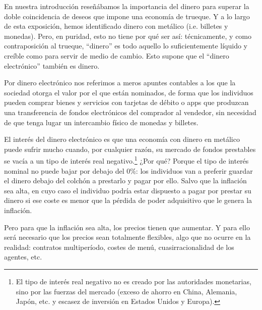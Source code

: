 \documentclass[10pt,a4paper]{article}
\begin{document}
En nuestra introducción reseñábamos la importancia del dinero para superar la doble coincidencia de deseos que impone una economía de trueque. Y a lo largo de esta exposición, hemos identificado dinero con metálico (i.e. billetes y monedas). Pero, en puridad, esto no tiene por qué ser así: técnicamente, y como contraposición al trueque, “dinero” es todo aquello lo suficientemente líquido y creíble como para servir de medio de cambio. Esto supone que el “dinero electrónico” también es dinero. 

Por dinero electrónico nos referimos a meros apuntes contables a los que la sociedad otorga el valor por el que están nominados, de forma que los individuos pueden comprar bienes y servicios con tarjetas de débito o apps que produzcan una transferencia de fondos electrónicos del comprador al vendedor, sin necesidad de que tenga lugar un intercambio físico de monedas y billetes. 

El interés del dinero electrónico es que una economía con dinero en metálico puede sufrir mucho cuando, por cualquier razón, su mercado de fondos prestables se vacía a un tipo de interés real negativo.\footnote{
El tipo de interés real negativo no es creado por las autoridades monetarias, sino por las fuerzas del mercado (exceso de ahorro en China, Alemania, Japón, etc. y escasez de inversión en Estados Unidos y Europa).
} ¿Por qué? Porque el tipo de interés nominal no puede bajar por debajo del 0\%: los individuos van a preferir guardar el dinero debajo del colchón a prestarlo y pagar por ello. Salvo que la inflación sea alta, en cuyo caso el individuo podría estar dispuesto a pagar por prestar su dinero si ese coste es menor que la pérdida de poder adquisitivo que le genera la inflación.

Pero para que la inflación sea alta, los precios tienen que aumentar. Y para ello será necesario que los precios sean totalmente flexibles, algo que no ocurre en la realidad: contratos multiperíodo, costes de menú, cuasirracionalidad de los agentes, etc.
\end{document}
